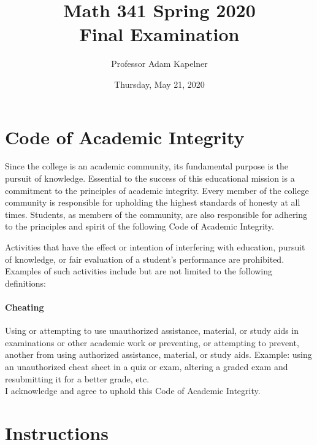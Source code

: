 \documentclass[12pt]{article}
\title{Math 341 Spring 2020 \\ Final Examination}
\author{Professor Adam Kapelner}
\date{Thursday, May 21, 2020}
\begin{document}
\maketitle


\thispagestyle{empty}

\section*{Code of Academic Integrity}

\footnotesize
Since the college is an academic community, its fundamental purpose is the pursuit of knowledge. Essential to the success of this educational mission is a commitment to the principles of academic integrity. Every member of the college community is responsible for upholding the highest standards of honesty at all times. Students, as members of the community, are also responsible for adhering to the principles and spirit of the following Code of Academic Integrity.

Activities that have the effect or intention of interfering with education, pursuit of knowledge, or fair evaluation of a student's performance are prohibited. Examples of such activities include but are not limited to the following definitions:

\paragraph{Cheating} Using or attempting to use unauthorized assistance, material, or study aids in examinations or other academic work or preventing, or attempting to prevent, another from using authorized assistance, material, or study aids. Example: using an unauthorized cheat sheet in a quiz or exam, altering a graded exam and resubmitting it for a better grade, etc.
\\

\noindent I acknowledge and agree to uphold this Code of Academic Integrity. \\


\normalsize

\section*{Instructions}
\end{document}
